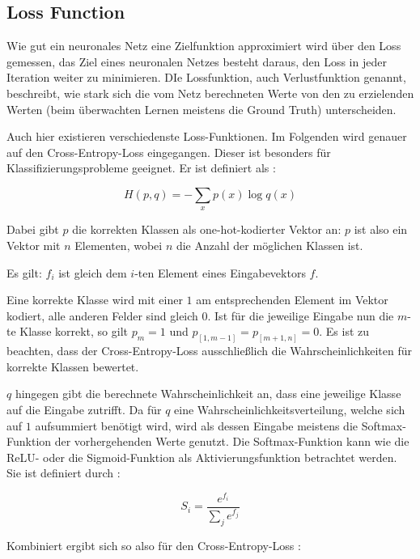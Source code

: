 \subsection{Loss Function}
\label{ssec:loss_function}

Wie gut ein neuronales Netz eine Zielfunktion approximiert wird über den Loss gemessen, \dahe das Ziel eines neuronalen Netzes besteht daraus, den Loss in jeder Iteration weiter zu minimieren. DIe Lossfunktion, auch Verlustfunktion genannt, beschreibt, wie stark sich die vom Netz berechneten Werte von den zu erzielenden Werten (beim überwachten Lernen meistens die Ground Truth) unterscheiden.

Auch hier existieren verschiedenste Loss-Funktionen. Im Folgenden wird genauer auf den Cross-Entropy-Loss eingegangen. Dieser ist besonders für Klassifizierungsprobleme geeignet. Er ist definiert als \cite{cs231n}:

\begin{equation}
H(p,q) = -\sum_x p(x)\log q(x)
\end{equation}

Dabei gibt $p$ die korrekten Klassen als one-hot-kodierter Vektor an: $p$ ist also ein Vektor mit $n$ Elementen, wobei $n$ die Anzahl der möglichen Klassen ist. 

Es gilt: $f_i$ ist gleich dem $i$-ten Element eines Eingabevektors $f$.

Eine korrekte Klasse wird mit einer $1$ am entsprechenden Element im Vektor kodiert, alle anderen Felder sind gleich $0$. Ist für die jeweilige Eingabe nun \bspw die $m$-te Klasse korrekt, so gilt $p_m=1$ und $p_{\left[1,m-1\right]} = p_{\left[m+1,n\right]} = 0$. Es ist zu beachten, dass der Cross-Entropy-Loss ausschließlich die Wahrscheinlichkeiten für korrekte Klassen bewertet.

$q$ hingegen gibt die berechnete Wahrscheinlichkeit an, dass eine jeweilige Klasse auf die Eingabe zutrifft. Da für $q$ eine Wahrscheinlichkeitsverteilung, welche sich auf $1$ aufsummiert benötigt wird, wird als dessen Eingabe meistens die Softmax-Funktion der vorhergehenden Werte genutzt. Die Softmax-Funktion kann wie die ReLU- oder die Sigmoid-Funktion als Aktivierungsfunktion betrachtet werden. Sie ist definiert durch \cite{cs231n}:

\begin{equation}
S_i=\frac{e^{f_i}}{\sum_j e^{f_j}}
\end{equation}

Kombiniert ergibt sich so also für den Cross-Entropy-Loss \cite{cs231n}:

